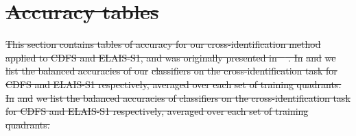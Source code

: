 \documentclass[11pt, a4paper]{book}
\providecommand{\DIFdeltex}[1]{{\protect\color{red}\sout{#1}}}                      %
\providecommand{\DIFdel}[1]{\texorpdfstring{\DIFdeltex{#1}}{}} %
\begin{document}
\section{\DIFdel{Accuracy tables}}%
\addtocounter{section}{-1}%

\DIFdel{This section contains tables of accuracy for our cross-identification method applied to CDFS and
  ELAIS-S1, and was originally presented in \mbox{%
\citet{alger18radio}}\hspace{0pt}%
. In }%
\DIFdel{and }%
\DIFdel{we list the
  balanced accuracies of our }%
\DIFdel{classifiers on the cross-identification task for CDFS
  and ELAIS-S1 respectively, averaged over each set of training quadrants. In
  }%
\DIFdel{and }%
\DIFdel{we list the balanced
  accuracies of classifiers on the cross-identification task for CDFS and
  ELAIS-S1 respectively, averaged over each set of training quadrants.
}%
\end{document}
